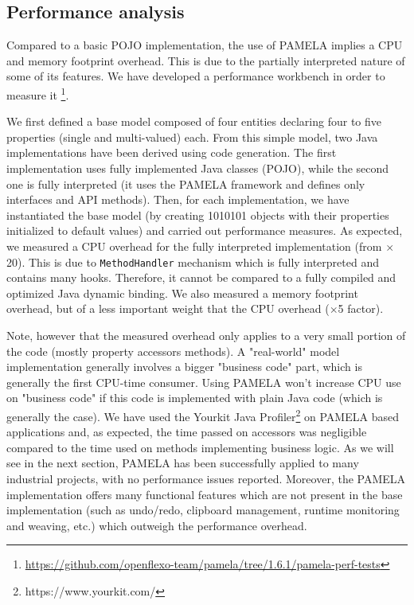 
\subsection{Performance analysis}

Compared to a basic POJO implementation, the use of PAMELA implies a CPU and memory footprint overhead. This is  due to the partially interpreted nature of some of its features. We have developed a performance workbench in order to measure it \footnote {\url{https://github.com/openflexo-team/pamela/tree/1.6.1/pamela-perf-tests}}. 

We first defined a base model composed of four entities declaring four to five properties (single and multi-valued) each. From this simple model, two Java implementations have been derived using code generation. The first implementation uses fully implemented Java classes (POJO), while the second one is fully interpreted (it uses the PAMELA framework and defines only interfaces and API methods). Then, for each implementation, we have instantiated the base model (by creating 1010101 objects with their properties initialized to default values) and carried out performance measures.  As expected, we measured a CPU overhead for the fully interpreted implementation (from $\times$20). This is due to \texttt{MethodHandler} mechanism which is fully interpreted and contains many hooks. Therefore, it  cannot be compared to a fully compiled and optimized Java dynamic binding. We also measured a memory footprint overhead, but of a less important weight that the CPU overhead ($\times$5 factor).

Note, however that the measured overhead only applies to a very small portion of the code (mostly property accessors methods).  A "real-world" model implementation generally involves a bigger "business code" part, which is generally the first CPU-time consumer. Using PAMELA won’t increase CPU use on "business code" if this code is implemented with plain Java code (which is generally the case). We have used the Yourkit Java Profiler\footnote{https://www.yourkit.com/} on PAMELA based applications and, as expected, the time passed on accessors was negligible compared to the time used on methods implementing business logic. As we will see in the next section, PAMELA has been successfully applied to many industrial projects, with no performance issues reported. Moreover, the PAMELA implementation offers many functional features which are not present in the base implementation (such as undo/redo, clipboard management, runtime monitoring and weaving, etc.) which outweigh the performance overhead.


